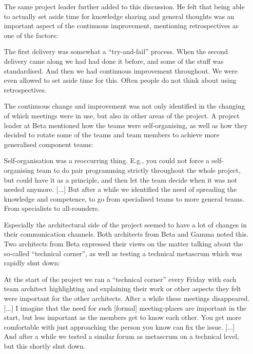 The same project leader further added to this discussion. He felt that being able to actually set aside time for knowledge sharing and general thoughts was an important aspect of the continuous improvement, mentioning retrospectives as one of the factors:

\begin{fancyquotes}
The first delivery was somewhat a ``try-and-fail'' process. When the second delivery came along we had had done it before, and some of the stuff was standardised. And then we had continuous improvement throughout. We were even allowed to set aside time for this. Often people do not think about using retrospectives.
\end{fancyquotes}

The continuous change and improvement was not only identified in the changing of which meetings were in use, but also in other areas of the project. A project leader at Beta mentioned how the teams were self-organising, as well as how they decided to rotate some of the teams and team members to achieve more generalised component teams:

\begin{fancyquotes}
Self-organisation was a reoccurring thing. E.g., you could not force a self-organising team to do pair programming strictly throughout the whole project, but could have it as a principle, and then let the team decide when it was not needed anymore. [...] But after a while we identified the need of spreading the knowledge and competence, to go from specialised teams to more general teams. From specialists to all-rounders.
\end{fancyquotes}

Especially the architectural side of the project seemed to have a lot of changes in their communication channels. Both architects from Beta and Gamma noted this. Two architects from Beta expressed their views on the matter talking about the so-called ``technical corner'', as well as testing a technical metascrum which was rapidly shut down:

\begin{fancyquotes}
At the start of the project we ran a ``technical corner'' every Friday with each team architect highlighting and explaining their work or other aspects they felt were important for the other architects. After a while these meetings disappeared. [...] I imagine that the need for such [formal] meeting-places are important in the start, but less important as the members get to know each other. You get more comfortable with just approaching the person you know can fix the issue. [...] And after a while we tested a similar forum as metascrum on a technical level, but this shortly shut down.
\end{fancyquotes}

